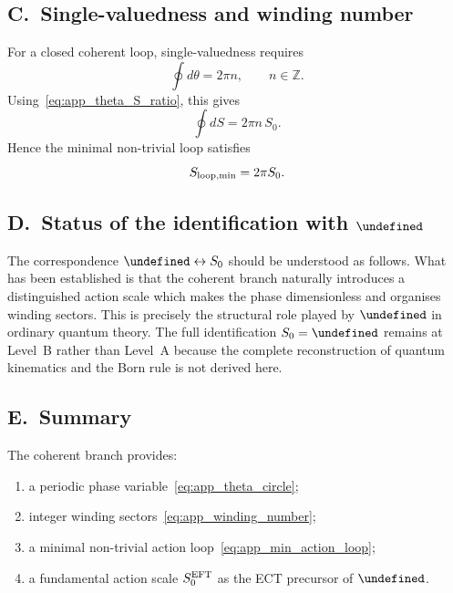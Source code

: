 \documentclass[11pt,a4paper]{article}
\let\hbar\undefined
\numberwithin{equation}{section}
\begin{document}
\subsection*{C.\ Single-valuedness and winding number}

For a closed coherent loop, single-valuedness requires
\begin{equation}
  \oint d\theta = 2\pi n, \qquad n\in\mathbb{Z}.
  \label{eq:app_winding_number}
\end{equation}
Using~\eqref{eq:app_theta_S_ratio}, this gives
\begin{equation}
  \oint dS = 2\pi n\,S_0.
  \label{eq:app_action_loop_quantisation}
\end{equation}
Hence the minimal non-trivial loop satisfies
\begin{equation}
  S_{\rm loop,min} = 2\pi S_0.
  \label{eq:app_min_action_loop}
\end{equation}

\subsection*{D.\ Status of the identification with $\hbar$}

The correspondence $\hbar \leftrightarrow S_0$ should be understood
as follows.
What has been established is that the coherent branch naturally
introduces a distinguished action scale which makes the phase
dimensionless and organises winding sectors.
This is precisely the structural role played by $\hbar$ in ordinary
quantum theory.
The full identification $S_0 = \hbar$ remains at Level~B rather than
Level~A because the complete reconstruction of quantum kinematics and
the Born rule is not derived here.

\subsection*{E.\ Summary}

The coherent branch provides:
\begin{enumerate}
  \item a periodic phase variable~\eqref{eq:app_theta_circle};
  \item integer winding sectors~\eqref{eq:app_winding_number};
  \item a minimal non-trivial action loop~\eqref{eq:app_min_action_loop};
  \item a fundamental action scale $S_0^{\rm EFT}$ as the ECT precursor of $\hbar$.
\end{enumerate}
\end{document}
